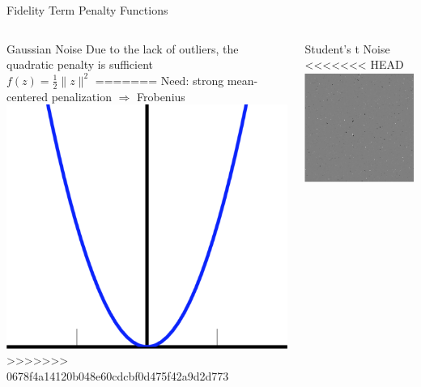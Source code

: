 \documentclass[12pt]{beamer}
\begin{document}
\begin{frame}{Fidelity Term Penalty Functions}
\begin{columns}[T]
\begin{column}{0.45\linewidth}
\begin{block}{Gaussian Noise}
		{\footnotesize Due to the lack of outliers, the quadratic penalty is sufficient} \\[1ex]
		\hspace{3em} $f(z) = \frac{1}{2} \| z \|^2$
=======
		Need: strong mean-centered penalization $\Rightarrow$ Frobenius  \\ %
		\includegraphics[scale=0.1]{../figures/quadratic}
>>>>>>> 0678f4a14120b048e60cdcbf0d475f42a9d2d773
		\end{block}
	\end{column}
	\begin{column}{0.45\linewidth}
		\begin{block}{Student's t Noise}
<<<<<<< HEAD
		\quad \includegraphics[scale=0.15]{../figures/student_t_noise.png} \hspace{1.5em}

\end{block}
\end{column}
\end{columns}
\end{frame}
\end{document}
